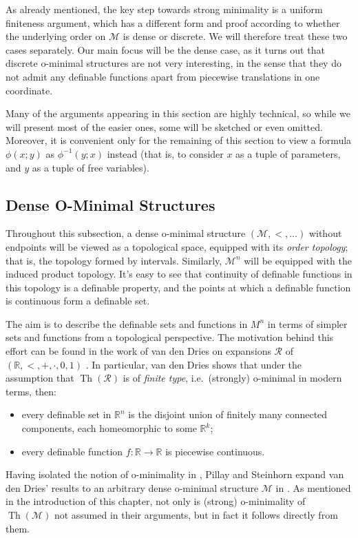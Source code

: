 \documentclass[a4paper]{report}
\newcommand{\ind}{\hspace{15pt}}
\newcommand{\R}{\mathbb{R}}
\newcommand{\M}{\mathcal{M}}
\newcommand{\Rns}{\mathcal{R}}
\DeclareMathOperator{\Th}{Th}
\theoremstyle{definition}
\theoremstyle{remstyle}
\begin{document}
\ind As already mentioned, the key step towards strong minimality is a uniform finiteness argument, which has a different form and proof according to whether the underlying order on $\M$ is dense or discrete. We will therefore treat these two cases separately. Our main focus will be the dense case, as it turns out that discrete o-minimal structures are not very interesting, in the sense that they do not admit any definable functions apart from piecewise translations in one coordinate.

\ind Many of the arguments appearing in this section are highly technical, so while we will present most of the easier ones, some will be sketched or even omitted. Moreover, it is convenient only for the remaining of this section to view a formula $\phi(x;y)$ as $\phi^{-1}(y;x)$ instead (that is, to consider $x$ as a tuple of parameters, and $y$ as a tuple of free variables).


\subsection{Dense O-Minimal Structures}

\ind Throughout this subsection, a dense o-minimal structure $(\M,<,\ldots)$ without endpoints will be viewed as a topological space, equipped with its \emph{order topology}; that is, the topology formed by intervals. Similarly, $\M^n$ will be equipped with the induced product topology. It's easy to see that continuity of definable functions in this topology is a definable property, and the points at which a definable function is continuous form a definable set.

\ind The aim is to describe the definable sets and functions in $M^n$ in terms of simpler sets and functions from a topological perspective. The motivation behind this effort can be found in the work of van den Dries on expansions $\Rns$ of $(\R,<,+,\cdot,0,1)$ \cite{vdr}. In particular, van den Dries shows that under the assumption that $\Th(\Rns)$ is of \emph{finite type}, i.e.\ (strongly) o-minimal in modern terms, then:
\begin{itemize}
	\item every definable set in $\R^n$ is the disjoint union of finitely many connected components, each homeomorphic to some $\R^k$;
	\item every definable function $f:\R\to\R$ is piecewise continuous.
\end{itemize}
Having isolated the notion of o-minimality in \cite{defI}, Pillay and Steinhorn expand van den Dries' results to an arbitrary dense o-minimal structure $\M$ in \cite{defII}. As mentioned in the introduction of this chapter, not only is (strong) o-minimality of $\Th(\M)$ not assumed in their arguments, but in fact it follows directly from them.
\end{document}
